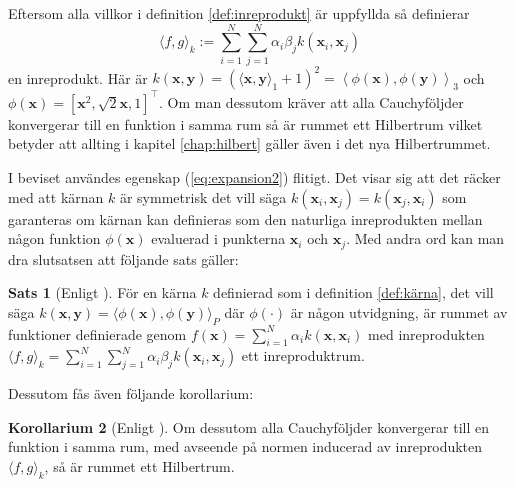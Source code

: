 \documentclass[a4paper, 12pt]{report}
\theoremstyle{definition}
\newtheorem{thm}{Sats}[section]
\newtheorem{cor}[thm]{Korollarium}
\theoremstyle{remark}
\newcommand{\bfx}{\mathbf{x}}
\newcommand{\bfy}{\mathbf{y}}
\begin{document}
\begin{enumerate}

\end{enumerate}
Eftersom alla villkor i definition \ref{def:inreprodukt} är uppfyllda så definierar \begin{equation*}\langle f, g\rangle_k:=\sum_{i=1}^{N}\sum_{j=1}^{N}\alpha_i\beta_jk\left(\bfx_i, \bfx_j\right)\end{equation*} en inreprodukt. Här är $k\left(\bfx, \bfy\right)=\left(\langle \bfx, \bfy\rangle_1 + 1\right)^2= \left\langle \phi\left(\bfx\right),  \phi\left(\bfy\right)\right\rangle_3$ och $\phi\left(\bfx\right)=\left[\bfx^2, \sqrt{2}\bfx, 1 \right]^\intercal$. Om man dessutom kräver att alla Cauchyföljder konvergerar till en funktion i samma rum så är rummet ett Hilbertrum vilket betyder att allting i kapitel \ref{chap:hilbert} gäller även i det nya Hilbertrummet.

I beviset användes egenskap (\ref{eq:expansion2}) flitigt. Det visar sig att det räcker med att kärnan $k$ är symmetrisk det vill säga $k\left(\bfx_i, \bfx_j\right)=k\left(\bfx_j, \bfx_i\right)$ som garanteras om kärnan kan definieras som den naturliga inreprodukten mellan någon funktion $\phi\left(\mathbf{x}\right)$ evaluerad i punkterna $\bfx_i$ och $\bfx_j$. Med andra ord kan man dra slutsatsen att följande sats gäller:
\begin{thm}[Enligt \cite{LearningKernels}]\label{thm:kärnainreprodukt}
	För en kärna $k$ definierad som i definition \ref{def:kärna}, det vill säga $k\left(\bfx, \bfy\right)=\langle \phi\left(\bfx\right), \phi\left(\bfy\right)\rangle_P$ där $\phi\left(\cdot\right)$ är någon utvidgning, är rummet av funktioner definierade genom $f\left(\bfx\right) = \sum_{i=1}^{N}\alpha_ik\left(\bfx, \bfx_i\right)$ med inreprodukten $\langle f, g\rangle_k = \sum_{i=1}^{N}\sum_{j=1}^{N} \alpha_i\beta_jk\left(\bfx_i, \bfx_j\right)$ ett inreproduktrum.
\end{thm}
Dessutom fås även följande korollarium:
\begin{cor}[Enligt \cite{LearningKernels}]\label{cor:kärnahilbert}
	Om dessutom alla Cauchyföljder konvergerar till en funktion i samma rum, med avseende på normen inducerad av inreprodukten $\langle f, g\rangle_k$, så är rummet ett Hilbertrum.
\end{cor}
\end{document}
